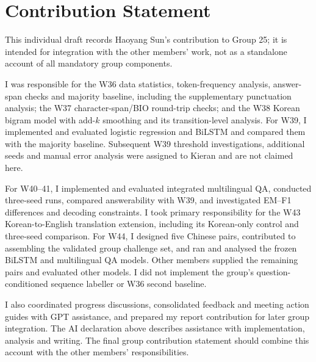 \documentclass[11pt]{article}
\begin{document}
\section{Contribution Statement}
This individual draft records Haoyang Sun's contribution to Group 25; it is intended for integration with the other members' work, not as a standalone account of all mandatory group components.

I was responsible for the W36 data statistics, token-frequency analysis, answer-span checks and majority baseline, including the supplementary punctuation analysis; the W37 character-span/BIO round-trip checks; and the W38 Korean bigram model with add-$k$ smoothing and its transition-level analysis. For W39, I implemented and evaluated logistic regression and BiLSTM and compared them with the majority baseline. Subsequent W39 threshold investigations, additional seeds and manual error analysis were assigned to Kieran and are not claimed here.

For W40--41, I implemented and evaluated integrated multilingual QA, conducted three-seed runs, compared answerability with W39, and investigated EM--F1 differences and decoding constraints. I took primary responsibility for the W43 Korean-to-English translation extension, including its Korean-only control and three-seed comparison. For W44, I designed five Chinese pairs, contributed to assembling the validated group challenge set, and ran and analysed the frozen BiLSTM and multilingual QA models. Other members supplied the remaining pairs and evaluated other models. I did not implement the group's question-conditioned sequence labeller or W36 second baseline.

I also coordinated progress discussions, consolidated feedback and meeting action guides with GPT assistance, and prepared my report contribution for later group integration. The AI declaration above describes assistance with implementation, analysis and writing. The final group contribution statement should combine this account with the other members' responsibilities.
\end{document}
